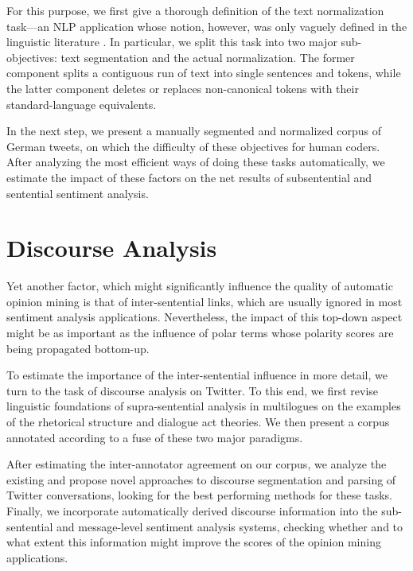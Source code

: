 \documentclass{article}
\begin{document}
For this purpose, we first give a thorough definition of the text
normalization task---an NLP application whose notion, however, was
only vaguely defined in the linguistic literature \cite{Eisenstein:13}.
In particular, we split this task into two major sub-objectives: text
segmentation and the actual normalization.  The former component
splits a contiguous run of text into single sentences and tokens,
while the latter component deletes or replaces non-canonical tokens
with their standard-language equivalents.

In the next step, we present a manually segmented and normalized
corpus of German tweets, on which the difficulty of these objectives
for human coders.  After analyzing the most efficient ways of doing
these tasks automatically, we estimate the impact of these factors on
the net results of subsentential and sentential sentiment analysis.

\section*{Discourse Analysis}
Yet another factor, which might significantly influence the quality of
automatic opinion mining is that of inter-sentential links, which are
usually ignored in most sentiment analysis applications.
Nevertheless, the impact of this top-down aspect might be as important
as the influence of polar terms whose polarity scores are being
propagated bottom-up.

To estimate the importance of the inter-sentential influence in more
detail, we turn to the task of discourse analysis on Twitter.  To this
end, we first revise linguistic foundations of supra-sentential
analysis in multilogues on the examples of the rhetorical structure
and dialogue act theories.  We then present a corpus annotated
according to a fuse of these two major paradigms.

After estimating the inter-annotator agreement on our corpus, we
analyze the existing and propose novel approaches to discourse
segmentation and parsing of Twitter conversations, looking for the
best performing methods for these tasks.  Finally, we incorporate
automatically derived discourse information into the sub-sentential
and message-level sentiment analysis systems, checking whether and to
what extent this information might improve the scores of the opinion
mining applications.



\end{document}

